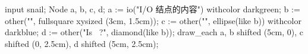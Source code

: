 \usemodule[zhfonts]
\startMPpage
input snail;
Node a, b, c, d;
a := io("I/O 结点的内容") withcolor darkgreen;
b := other("\CONTEXT", fullsquare xysized (3cm, 1.5cm));
c := other("\METAPOST", ellipse(like b)) withcolor darkblue;
d := other("Is \LUATEX\ ?", diamond(like b));
draw_each a, b shifted (5cm, 0), c shifted (0, 2.5cm), d shifted (5cm, 2.5cm);
\stopMPpage
